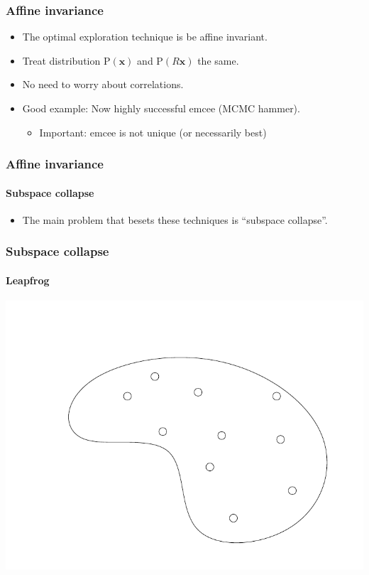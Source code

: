 \documentclass[%
]{beamer}
\newcommand{\prob}{\mathrm{P}}
\begin{document}
\begin{frame}
  \frametitle{Affine invariance}
  \begin{itemize}
    \pause\item The optimal exploration technique is be affine invariant.
    \pause\item Treat distribution $\prob(\mathbf{x})$ and $\prob(R \mathbf{x})$ the same.
    \pause\item No need to worry about correlations.
    \pause\item Good example: Now highly successful emcee (MCMC hammer).
      \begin{itemize}
        \item Important: emcee is not unique (or necessarily best)
      \end{itemize}
  \end{itemize}
\end{frame}




\begin{frame}
  \frametitle{Affine invariance}
  \framesubtitle{Subspace collapse}
  \begin{itemize}
    \pause\item The main problem that besets these techniques is ``subspace collapse''.
  \end{itemize}
\end{frame}

\begin{frame}
  \frametitle{Subspace collapse}
  \framesubtitle{Leapfrog}
  \includegraphics[width=\textwidth,page=5]{figures/leapfrog}
\end{frame}
\end{document}
